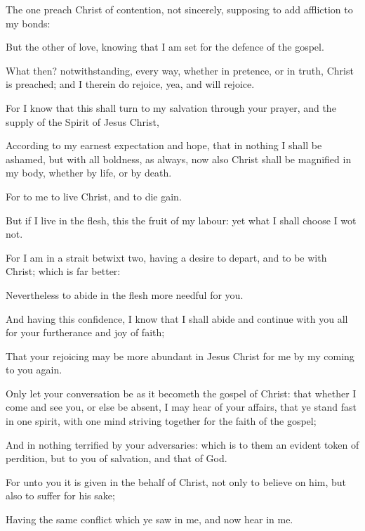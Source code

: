 {The
one
preach
Christ
of
contention,
not
sincerely,
supposing to
add
affliction
to
my
bonds:

But the
other
of
love,
knowing
that I am
set
for the
defence of the
gospel.

What
then?
notwithstanding,
every
way,
whether in
pretence,
or in
truth,
Christ is
preached;
and
I
therein do
rejoice,
yea,
and will
rejoice.

For I
know
that
this shall
turn
to
my
salvation
through
your
prayer,
and the
supply of the
Spirit of
Jesus
Christ,

According
to
my earnest
expectation
and
{}
hope,
that
in
nothing I shall be
ashamed,
but
{}
with
all
boldness,
as
always,
{}
now
also
Christ shall be
magnified
in
my
body,
whether
{}
by
life,
or
by
death.

For to
me to
live
{}
Christ,
and to
die
{}
gain.

But
if I
live
in the
flesh,
this
{} the
fruit
of
my
labour:
yet
what I shall
choose I
wot
not.

For I am in a
strait
betwixt
two,
having a
desire
to
depart,
and to
be
with
Christ; which
is
far
better:

Nevertheless to
abide
in the
flesh
{} more
needful
for
you.

And
having
this
confidence, I
know
that I shall
abide
and continue
with
you
all
for
your
furtherance
and
joy of
faith;

That
your
rejoicing may be more
abundant
in
Jesus
Christ
for
me
by
my
coming
to
you
again.

Only let your conversation
be as it
becometh the
gospel of
Christ:
that
whether I
come
and
see
you, or
else be
absent, I may
hear of
your
affairs,
that ye stand
fast
in
one
spirit,
with
one
mind striving
together for the
faith of the
gospel;

And
in
nothing
terrified
by your
adversaries:
which
is to
them an evident
token of
perdition,
but to
you of
salvation,
and
that
of
God.

For unto
you it is
given in the
behalf of
Christ,
not
only to
believe
on
him,
but
also to
suffer
for
his
sake;

Having
the
same
conflict
which ye
saw
in
me,
and
now
hear
{}
in
me.




\par }
